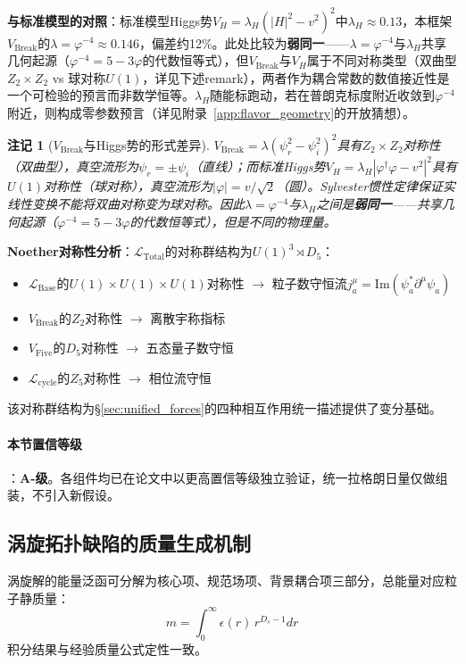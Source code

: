 \documentclass[12pt,a4paper,twocolumn]{article}
\renewcommand{\phi}{\varphi}
\newtheorem{remark}[theorem]{注记}
\begin{document}
\textbf{与标准模型的对照}：标准模型Higgs势$V_H = \lambda_H(|H|^2 - v^2)^2$中$\lambda_H \approx 0.13$，本框架$V_{\text{Break}}$的$\lambda = \phi^{-4} \approx 0.146$，偏差约12\%。此处比较为\textbf{弱同一}——$\lambda = \phi^{-4}$与$\lambda_H$共享几何起源（$\phi^{-4} = 5 - 3\phi$的代数恒等式），但$V_{\text{Break}}$与$V_H$属于不同对称类型（双曲型$Z_2\times Z_2$ vs 球对称$U(1)$，详见下述remark），两者作为耦合常数的数值接近性是一个可检验的预言而非数学恒等。$\lambda_H$随能标跑动，若在普朗克标度附近收敛到$\phi^{-4}$附近，则构成零参数预言（详见附录~\ref{app:flavor_geometry}的开放猜想）。

\begin{remark}[$V_{\text{Break}}$与Higgs势的形式差异]
$V_{\text{Break}} = \lambda(\psi_r^2 - \psi_i^2)^2$具有$Z_2 \times Z_2$对称性（双曲型），真空流形为$\psi_r = \pm\psi_i$（直线）；而标准Higgs势$V_H = \lambda_H|\phi^\dagger\phi - v^2|^2$具有$U(1)$对称性（球对称），真空流形为$|\phi| = v/\sqrt{2}$（圆）。Sylvester惯性定律保证实线性变换不能将双曲对称变为球对称。因此$\lambda = \phi^{-4}$与$\lambda_H$之间是\textbf{弱同一}——共享几何起源（$\phi^{-4} = 5 - 3\phi$的代数恒等式），但是不同的物理量。
\end{remark}

\textbf{Noether对称性分析}：$\mathcal{L}_{\text{Total}}$的对称群结构为$U(1)^3 \rtimes D_5$：
\begin{itemize}
\item $\mathcal{L}_{\text{Base}}$的$U(1) \times U(1) \times U(1)$对称性 $\to$ 粒子数守恒流$j^\mu_a = \text{Im}(\psi_a^* \partial^\mu \psi_a)$
\item $V_{\text{Break}}$的$Z_2$对称性 $\to$ 离散宇称指标
\item $V_{\text{Five}}$的$D_5$对称性 $\to$ 五态量子数守恒
\item $\mathcal{L}_{\text{cycle}}$的$Z_5$对称性 $\to$ 相位流守恒
\end{itemize}
该对称群结构为§\ref{sec:unified_forces}的四种相互作用统一描述提供了变分基础。

\paragraph{本节置信等级}：\textbf{A-级}。各组件均已在论文中以更高置信等级独立验证，统一拉格朗日量仅做组装，不引入新假设。

\subsection{涡旋拓扑缺陷的质量生成机制}
涡旋解的能量泛函可分解为核心项、规范场项、背景耦合项三部分，总能量对应粒子静质量：
\[
m = \int_0^\infty \epsilon(r) \, r^{D_s-1} dr
\]
积分结果与经验质量公式定性一致。
\end{document}
